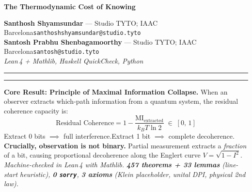 \documentclass[10pt, a4paper]{article}
\newenvironment{leftbox}{%
  \par\vspace{0.3em}%
  \noindent\hspace{0pt}%
  \begin{minipage}[t]{3pt}\color{Black}\rule{3pt}{5.5\baselineskip}\end{minipage}%
  \hspace{8pt}%
  \begin{minipage}[t]{\dimexpr\textwidth-15pt}\small
}{%
  \end{minipage}\par\vspace{0.3em}%
}
\begin{document}
\noindent
{\fontsize{17}{21}\selectfont\bfseries The Thermodynamic Cost of Knowing}

\vspace{0.15em}

\vspace{0.15em}

\vspace{0.25em}

\vspace{0.4em}

\vspace{0.2em}
{\footnotesize\color{MidGray}%
\textbf{Santhosh Shyamsundar} --- Studio TYTO; IAAC Barcelona\quad\texttt{santhoshshyamsundar@studio.tyto}\\[1pt]
\textbf{Santosh Prabhu Shenbagamoorthy} --- Studio TYTO; IAAC Barcelona\quad\texttt{santosh@studio.tyto}\\[2pt]
\textit{Lean\,4 + Mathlib, Haskell QuickCheck, Python}}

\vspace{0.3em}
{\color{Black}\rule{\textwidth}{2.5pt}}

\vspace{0.25em}

\begin{leftbox}
\textbf{Core Result: Principle of Maximal Information Collapse.}
When an observer extracts which-path information from a quantum system, the residual coherence capacity is:
\[
\text{Residual Coherence} = 1 - \frac{\text{MI}_{\text{extracted}}}{k_B T \ln 2} \;\in\; [0,\,1]
\]
Extract 0 bits $\implies$ full interference.\quad Extract 1 bit $\implies$ complete decoherence.\\[2pt]
\textbf{Crucially, observation is not binary.} Partial measurement extracts a \emph{fraction} of a bit, causing proportional decoherence along the Englert curve $V = \sqrt{1 - I^2}$.\\[2pt]
\textit{Machine-checked in Lean\,4 with Mathlib.\; \textbf{457 theorems + 33 lemmas} (line-start heuristic),\; \textbf{0 \texttt{sorry}},\; \textbf{3 axioms} (Klein placeholder, unital DPI, physical 2nd law).}
\end{leftbox}
\end{document}
